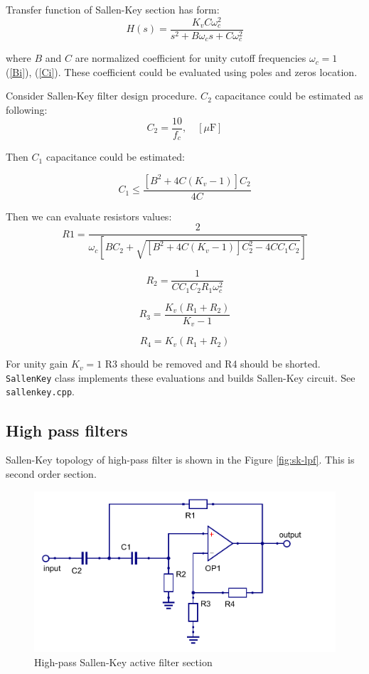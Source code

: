 Transfer function of Sallen-Key section has form:
\begin{equation}
 H(s)=\frac{K_v C\omega_c^2}{s^2+B\omega_cs+C\omega_c^2} \label{sk-lpf-trfunc}
\end{equation}

where $B$ and $C$ are normalized coefficient for unity cutoff frequencies
$\omega_c=1$ (\ref{Bi}), (\ref{Ci}). These coefficient could be evaluated using
poles and zeros location.

Consider Sallen-Key filter design procedure. $C_2$ capacitance could be
estimated as following:
\begin{equation}
 C_2=\frac{10}{f_c},  \quad [\mu\mbox{F}] \label{lp-C2}
\end{equation}

Then $C_1$ capacitance could be estimated:

\begin{equation}
 C_1\leq \frac{[B^2+4C(K_v-1)]C_2}{4C}
\end{equation}

Then we can evaluate resistors values:
\begin{equation}
 R1 = \frac{2}{\omega_c[BC_2+\sqrt{[B^2+4C(K_v-1)]C^2_2-4CC_1C_2}]}
\end{equation}

\begin{equation}
 R_2=\frac{1}{CC_1C_2R_1\omega_c^2}
\end{equation}

\begin{equation}
 R_3=\frac{K_v(R_1+R_2)}{K_v-1}
\end{equation}

\begin{equation}
 R_4=K_v(R_1+R_2)
\end{equation}

For unity gain $K_v=1$ R3 should be removed and R4 should be shorted.
\verb|SallenKey| class implements these evaluations and builds Sallen-Key
circuit. See \verb|sallenkey.cpp|.


\subsection{High pass filters}

Sallen-Key topology of high-pass filter is shown in the Figure
\ref{fig:sk-lpf}. This is second order section.

\begin{figure}[!ht]
  \centering
  \includegraphics[width=0.6\linewidth]{pics/sk-hpf}
  \caption{High-pass Sallen-Key active filter section}
  \label{fig:sk-hpf}
\end{figure}


